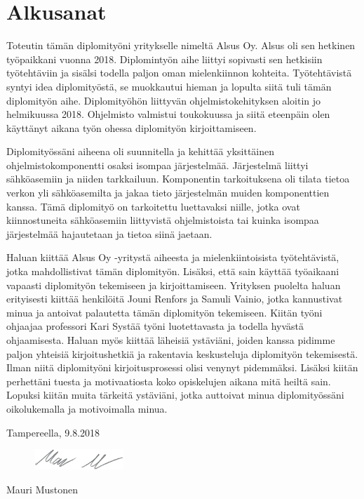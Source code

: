 \chapter*{Alkusanat}
\label{ch:alkusanat}
Toteutin tämän diplomityöni yritykselle nimeltä Alsus Oy. Alsus oli sen hetkinen työpaikkani vuonna 2018. Diplomintyön aihe liittyi sopivasti sen hetkisiin työtehtäviin ja sisälsi todella paljon oman mielenkiinnon kohteita. Työtehtävistä syntyi idea diplomityöstä, se muokkautui hieman ja lopulta siitä tuli tämän diplomityön aihe. Diplomityöhön liittyvän ohjelmistokehityksen aloitin jo helmikuussa 2018. Ohjelmisto valmistui toukokuussa ja siitä eteenpäin olen käyttänyt aikana työn ohessa diplomityön kirjoittamiseen.

Diplomityössäni aiheena oli suunnitella ja kehittää yksittäinen ohjelmistokomponentti osaksi isompaa järjestelmää. Järjestelmä liittyi sähköasemiin ja niiden tarkkailuun. Komponentin tarkoituksena oli tilata tietoa verkon yli sähköasemilta ja jakaa tieto järjestelmän muiden komponenttien kanssa. Tämä diplomityö on tarkoitettu luettavaksi niille, jotka ovat kiinnostuneita sähköasemiin liittyvistä ohjelmistoista tai kuinka isompaa järjestelmää hajautetaan ja tietoa siinä jaetaan.

Haluan kiittää Alsus Oy -yritystä aiheesta ja mielenkiintoisista työtehtävistä, jotka mahdollistivat tämän diplomityön. Lisäksi, että sain käyttää työaikaani vapaasti diplomityön tekemiseen ja kirjoittamiseen. Yrityksen puolelta haluan erityisesti kiittää henkilöitä Jouni Renfors ja Samuli Vainio, jotka kannustivat minua ja antoivat palautetta tämän diplomityön tekemiseen. Kiitän työni ohjaajaa professori Kari Systää työni luotettavasta ja todella hyvästä ohjaamisesta. Haluan myös kiittää läheisiä ystäviäni, joiden kanssa pidimme paljon yhteisiä kirjoitushetkiä ja rakentavia keskusteluja diplomityön tekemisestä. Ilman niitä diplomityöni kirjoitusprosessi olisi venynyt pidemmäksi. Lisäksi kiitän perhettäni tuesta ja motivaatiosta koko opiskelujen aikana mitä heiltä sain. Lopuksi kiitän muita tärkeitä ystäviäni, jotka auttoivat minua diplomityössäni oikolukemalla ja motivoimalla minua.

\vspace{2\baselineskip}

Tampereella, 9.8.2018

\begin{figure}[ht!]
	\includegraphics[width=0.3\textwidth,left]{pictures/signature.png}
\end{figure}

Mauri Mustonen